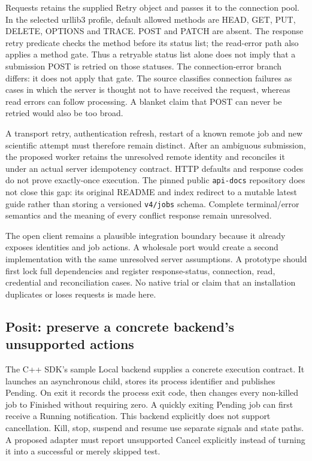 Requests retains the supplied Retry object and passes it to the connection
pool. In the selected urllib3 profile, default allowed methods are HEAD,
GET, PUT, DELETE, OPTIONS and TRACE. POST and PATCH are absent. The response
retry predicate checks the method before its status list; the read-error
path also applies a method gate. Thus a retryable status list alone does
not imply that a submission POST is retried on those statuses. The
connection-error branch differs: it does not apply that gate. The source
classifies connection failures as cases in which the server is thought not
to have received the request, whereas read errors can follow processing.
A blanket claim that POST can never be retried would also be too broad.
\citep{exec24_workflow_contracts_domino}

A transport retry, authentication refresh, restart of a known remote job
and new scientific attempt must therefore remain distinct. After an
ambiguous submission, the proposed worker retains the unresolved remote
identity and reconciles it under an actual server idempotency contract.
HTTP defaults and response codes do not prove exactly-once execution.
The pinned public \texttt{api-docs} repository does not close this gap:
its original README and index redirect to a mutable latest guide rather
than storing a versioned \texttt{v4/jobs} schema. Complete terminal/error
semantics and the meaning of every conflict response remain unresolved.
\citep{exec24_workflow_contracts_domino}

The open client remains a plausible integration boundary because it already
exposes identities and job actions. A wholesale port would create a second
implementation with the same unresolved server assumptions. A prototype
should first lock full dependencies and register response-status,
connection, read, credential and reconciliation cases. No native trial or
claim that an installation duplicates or loses requests is made here.

\subsection{Posit: preserve a concrete backend's unsupported actions}

The C++ SDK's sample Local backend supplies a concrete execution contract.
It launches an asynchronous child, stores its process identifier and
publishes Pending. On exit it records the process exit code, then changes
every non-killed job to Finished without requiring zero. A quickly exiting
Pending job can first receive a Running notification. This backend explicitly
does not support cancellation. Kill, stop, suspend and resume use separate
signals and state paths. A proposed adapter must report unsupported Cancel
explicitly instead of turning it into a successful or merely skipped test.
\citep{exec24_workflow_contracts_posit}

